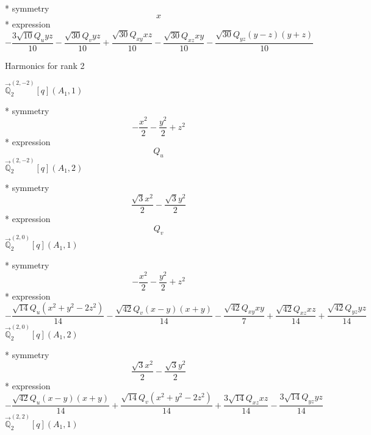 \documentclass[fleqn,8pt]{jsarticle}
\begin{document}
\noindent\quad ** symmetry
\begin{dmath*}
x
\end{dmath*}
\noindent\quad ** expression
\begin{dmath*}
- \frac{3 \sqrt{10} Q_{u} y z}{10} - \frac{\sqrt{30} Q_{v} y z}{10} + \frac{\sqrt{30} Q_{xy} x z}{10} - \frac{\sqrt{30} Q_{xz} x y}{10} - \frac{\sqrt{30} Q_{yz} \left(y - z\right) \left(y + z\right)}{10}
\end{dmath*}

\noindent * Harmonics for rank 2

\noindent\quad $\vec{\mathbb{Q}}_{2}^{(2,-2)}[q](A_{1},1)$

\noindent\quad ** symmetry
\begin{dmath*}
- \frac{x^{2}}{2} - \frac{y^{2}}{2} + z^{2}
\end{dmath*}
\noindent\quad ** expression
\begin{dmath*}
Q_{u}
\end{dmath*}
\noindent\quad $\vec{\mathbb{Q}}_{2}^{(2,-2)}[q](A_{1},2)$

\noindent\quad ** symmetry
\begin{dmath*}
\frac{\sqrt{3} x^{2}}{2} - \frac{\sqrt{3} y^{2}}{2}
\end{dmath*}
\noindent\quad ** expression
\begin{dmath*}
Q_{v}
\end{dmath*}
\noindent\quad $\vec{\mathbb{Q}}_{2}^{(2,0)}[q](A_{1},1)$

\noindent\quad ** symmetry
\begin{dmath*}
- \frac{x^{2}}{2} - \frac{y^{2}}{2} + z^{2}
\end{dmath*}
\noindent\quad ** expression
\begin{dmath*}
- \frac{\sqrt{14} Q_{u} \left(x^{2} + y^{2} - 2 z^{2}\right)}{14} - \frac{\sqrt{42} Q_{v} \left(x - y\right) \left(x + y\right)}{14} - \frac{\sqrt{42} Q_{xy} x y}{7} + \frac{\sqrt{42} Q_{xz} x z}{14} + \frac{\sqrt{42} Q_{yz} y z}{14}
\end{dmath*}
\noindent\quad $\vec{\mathbb{Q}}_{2}^{(2,0)}[q](A_{1},2)$

\noindent\quad ** symmetry
\begin{dmath*}
\frac{\sqrt{3} x^{2}}{2} - \frac{\sqrt{3} y^{2}}{2}
\end{dmath*}
\noindent\quad ** expression
\begin{dmath*}
- \frac{\sqrt{42} Q_{u} \left(x - y\right) \left(x + y\right)}{14} + \frac{\sqrt{14} Q_{v} \left(x^{2} + y^{2} - 2 z^{2}\right)}{14} + \frac{3 \sqrt{14} Q_{xz} x z}{14} - \frac{3 \sqrt{14} Q_{yz} y z}{14}
\end{dmath*}
\noindent\quad $\vec{\mathbb{Q}}_{2}^{(2,2)}[q](A_{1},1)$
\end{document}

